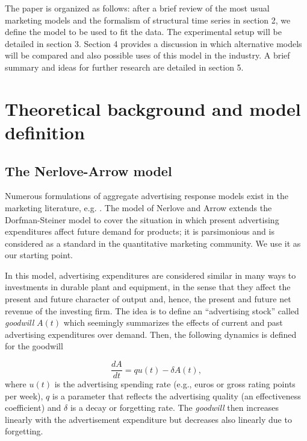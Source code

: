 The paper is organized as follows: after a brief review of the most usual marketing models and the formalism of structural time series in section 2, we define the model to be used to fit the data. The experimental setup will be detailed in section 3. Section 4 provides a discussion in which alternative models will be compared and also possible uses of this model in the industry. A brief summary and ideas for further research are detailed in section 5.



\section{Theoretical background and model definition}


\subsection{The Nerlove-Arrow model}


Numerous formulations of aggregate advertising response models exist in the marketing literature, e.g. \cite{little1979aggregate}. The model of Nerlove and Arrow \cite{nerlove1962optimal} extends the Dorfman-Steiner model to cover the situation in which present advertising expenditures affect future demand for products; it is parsimonious and is considered as a standard in the quantitative marketing community. We use it as our starting point.

In this model, advertising expenditures are considered similar in many ways to investments in durable plant and equipment, in the sense that they affect the present and future character of output and, hence, the present and future net revenue of the investing firm. The idea is to define an ``advertising stock'' called \emph{goodwill}  $A(t)$ which seemingly summarizes the effects of current and past advertising expenditures over demand. Then, the following dynamics is defined for the goodwill

\begin{equation}\label{eq:NA}
\frac{dA}{dt} = qu(t) - \delta A(t),
\end{equation}
where $u(t)$ is the advertising spending rate (e.g., euros or gross rating points per week), $q$ is a parameter that reflects the advertising quality (an effectiveness coefficient) and $\delta$ is a decay or forgetting rate. The \emph{goodwill} then increases linearly with the advertisement expenditure but decreases also linearly due to forgetting. %

